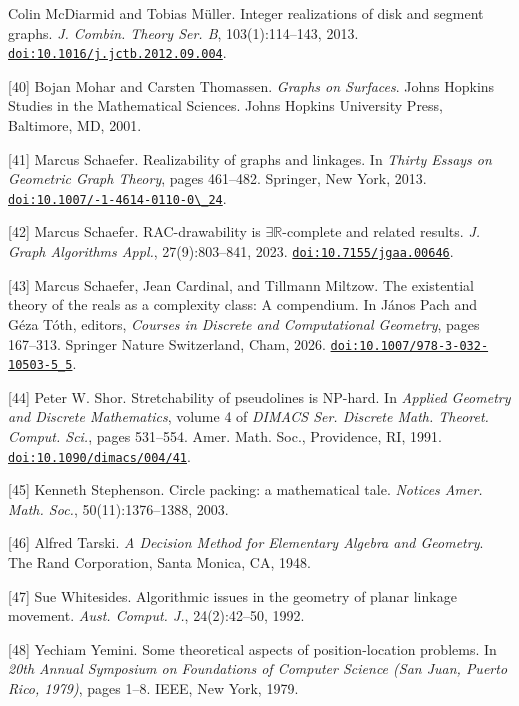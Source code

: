\documentclass{article}
\begin{document}
\begin{hangpars}
[39] Colin McDiarmid and Tobias Müller. Integer realizations of disk and segment graphs. \emph{J. Combin. Theory Ser. B}, 103(1):114–143, 2013. \href{https://doi.org/10.1016/j.jctb.2012.09.004}{\nolinkurl{doi:10.1016/j.jctb.2012.09.004}}.

[40] Bojan Mohar and Carsten Thomassen. \emph{Graphs on Surfaces}. Johns Hopkins Studies in the Mathematical Sciences. Johns Hopkins University Press, Baltimore, MD, 2001.

[41] Marcus Schaefer. Realizability of graphs and linkages. In \emph{Thirty Essays on Geometric Graph Theory}, pages 461–482. Springer, New York, 2013. \href{https://doi.org/10.1007/978-1-4614-0110-0_24}{\texttt{doi:10.1007/-1-4614-0110-0\textbackslash\_24}}.

[42] Marcus Schaefer. RAC-drawability is $\exists\mathbb{R}$-complete and related results. \emph{J. Graph Algorithms Appl.}, 27(9):803–841, 2023. \href{https://doi.org/10.7155/jgaa.00646}{\nolinkurl{doi:10.7155/jgaa.00646}}.

[43] Marcus Schaefer, Jean Cardinal, and Tillmann Miltzow. The existential theory of the reals as a complexity class: A compendium. In János Pach and Géza Tóth, editors, \emph{Courses in Discrete and Computational Geometry}, pages 167–313. Springer Nature Switzerland, Cham, 2026. \href{https://doi.org/10.1007/978-3-032-10503-5_5}{\nolinkurl{doi:10.1007/978-3-032-10503-5_5}}.

[44] Peter W. Shor. Stretchability of pseudolines is NP-hard. In \emph{Applied Geometry and Discrete Mathematics}, volume 4 of \emph{DIMACS Ser. Discrete Math. Theoret. Comput. Sci.}, pages 531–554. Amer. Math. Soc., Providence, RI, 1991. \href{https://doi.org/10.1090/dimacs/004/41}{\nolinkurl{doi:10.1090/dimacs/004/41}}.

[45] Kenneth Stephenson. Circle packing: a mathematical tale. \emph{Notices Amer. Math. Soc.}, 50(11):1376–1388, 2003.

[46] Alfred Tarski. \emph{A Decision Method for Elementary Algebra and Geometry}. The Rand Corporation, Santa Monica, CA, 1948.

[47] Sue Whitesides. Algorithmic issues in the geometry of planar linkage movement. \emph{Aust. Comput. J.}, 24(2):42–50, 1992.

[48] Yechiam Yemini. Some theoretical aspects of position-location problems. In \emph{20th Annual Symposium on Foundations of Computer Science (San Juan, Puerto Rico, 1979)}, pages 1–8. IEEE, New York, 1979.

\end{hangpars}
\end{document}
